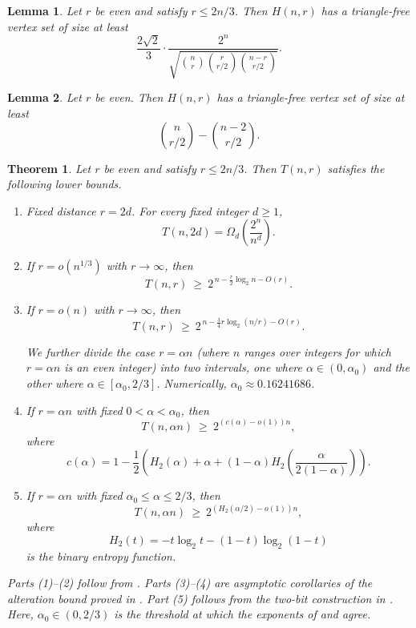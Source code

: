 \documentclass[10pt,a4paper]{amsart}
\newtheorem{theorem}{Theorem}
\newtheorem{lemma}{Lemma}
\begin{document}
\begin{lemma}\label{lem:alteration}
Let $r$ be even and satisfy $r\le 2n/3$.
Then $H(n,r)$ has a triangle-free vertex set of size at least
\[
\frac{2\sqrt{2}}{3}\cdot
\frac{2^n}{\sqrt{\binom{n}{r}\binom{r}{r/2}\binom{n-r}{r/2}}}.
\]
\end{lemma}

\begin{lemma}\label{lem:twobit}
Let $r$ be even.
Then $H(n,r)$ has a triangle-free vertex set of size at least
\[
\binom{n}{r/2}-\binom{n-2}{r/2}.
\]
\end{lemma}

\begin{theorem}\label{thm:lower-main}
Let $r$ be even and satisfy $r\le 2n/3$.
Then $T(n,r)$ satisfies the following lower bounds.

\begin{enumerate}
\item Fixed distance $r=2d$.
For every fixed integer $d\ge 1$,
\[
T(n,2d)=\Omega_d\!\left(\frac{2^n}{n^d}\right).
\]

\item If $r=o(n^{1/3})$ with $r\to\infty$, then
\[
T(n,r)\ \ge\ 2^{\,n-\frac r2\log_2 n-O(r)}.
\]

\item If $r=o(n)$ with $r\to\infty$, then
\[
T(n,r)\ \ge\ 2^{\,n-\frac{3}{4}r\log_2(n/r)-O(r)}.
\]

We further divide the case $r=\alpha n$ (where $n$ ranges over integers for which $r=\alpha n$ is an even integer) into two intervals, one where $\alpha\in(0,\alpha_0)$ and the other where $\alpha\in[\alpha_0,2/3]$.
Numerically, $\alpha_0\approx 0.16241686$.

\item If $r=\alpha n$ with fixed $0<\alpha<\alpha_0$, then
\[
T(n,\alpha n)\ \ge\ 2^{(c(\alpha)-o(1))n},
\]
where
\[
c(\alpha)=
1-\frac12\left(
H_2(\alpha)+\alpha+(1-\alpha)H_2\!\left(\frac{\alpha}{2(1-\alpha)}\right)
\right).
\]

\item If $r=\alpha n$ with fixed $\alpha_0\le \alpha\le 2/3$, then
\[
T(n,\alpha n)\ \ge\ 2^{(H_2(\alpha/2)-o(1))n},
\]
where
\[
H_2(t)=-t\log_2 t-(1-t)\log_2(1-t)
\]
is the binary entropy function.
\end{enumerate}

Parts (1)--(2) follow from .
Parts (3)--(4) are asymptotic corollaries of the alteration bound proved in .
Part (5) follows from the two-bit construction in .
Here, $\alpha_0\in(0,2/3)$ is the threshold at which the exponents of  and  agree.
\end{theorem}
\end{document}
